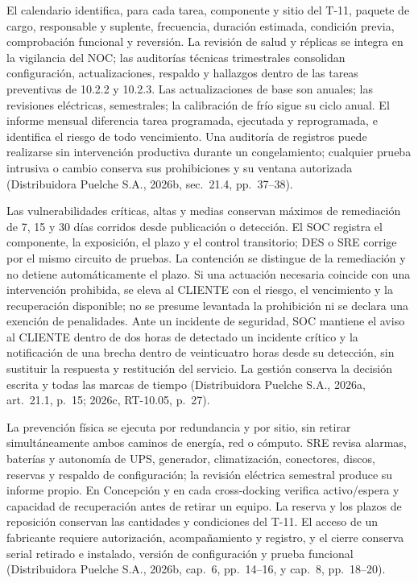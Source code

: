 El calendario identifica, para cada tarea, componente y sitio del T-11, paquete de cargo, responsable y suplente, frecuencia, duración estimada, condición previa, comprobación funcional y reversión. La revisión de salud y réplicas se integra en la vigilancia del NOC; las auditorías técnicas trimestrales consolidan configuración, actualizaciones, respaldo y hallazgos dentro de las tareas preventivas de 10.2.2 y 10.2.3. Las actualizaciones de base son anuales; las revisiones eléctricas, semestrales; la calibración de frío sigue su ciclo anual. El informe mensual diferencia tarea programada, ejecutada y reprogramada, e identifica el riesgo de todo vencimiento. Una auditoría de registros puede realizarse sin intervención productiva durante un congelamiento; cualquier prueba intrusiva o cambio conserva sus prohibiciones y su ventana autorizada (Distribuidora Puelche S.A., 2026b, sec.~21.4, pp.~37--38).

Las vulnerabilidades críticas, altas y medias conservan máximos de remediación de 7, 15 y 30 días corridos desde publicación o detección. El SOC registra el componente, la exposición, el plazo y el control transitorio; DES o SRE corrige por el mismo circuito de pruebas. La contención se distingue de la remediación y no detiene automáticamente el plazo. Si una actuación necesaria coincide con una intervención prohibida, se eleva al CLIENTE con el riesgo, el vencimiento y la recuperación disponible; no se presume levantada la prohibición ni se declara una exención de penalidades. Ante un incidente de seguridad, SOC mantiene el aviso al CLIENTE dentro de dos horas de detectado un incidente crítico y la notificación de una brecha dentro de veinticuatro horas desde su detección, sin sustituir la respuesta y restitución del servicio. La gestión conserva la decisión escrita y todas las marcas de tiempo (Distribuidora Puelche S.A., 2026a, art.~21.1, p.~15; 2026c, RT-10.05, p.~27).

La prevención física se ejecuta por redundancia y por sitio, sin retirar simultáneamente ambos caminos de energía, red o cómputo. SRE revisa alarmas, baterías y autonomía de UPS, generador, climatización, conectores, discos, reservas y respaldo de configuración; la revisión eléctrica semestral produce su informe propio. En Concepción y en cada cross-docking verifica activo/espera y capacidad de recuperación antes de retirar un equipo. La reserva y los plazos de reposición conservan las cantidades y condiciones del T-11. El acceso de un fabricante requiere autorización, acompañamiento y registro, y el cierre conserva serial retirado e instalado, versión de configuración y prueba funcional (Distribuidora Puelche S.A., 2026b, cap.~6, pp.~14--16, y cap.~8, pp.~18--20).


